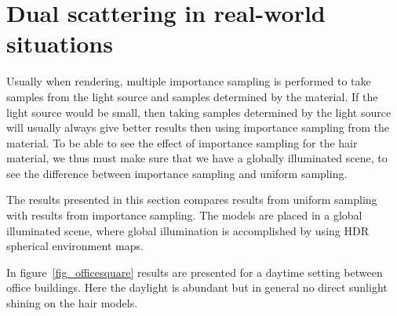 \documentclass[11pt,a4paper]{report}
\begin{document}


%
%

\section{Dual scattering in real-world situations}

Usually when rendering, multiple importance sampling is performed to take samples from the light source and samples determined by the material. If the light source would be small, then taking samples determined by the light source will usually always give better results then using importance sampling from the material. To be able to see the effect of importance sampling for the hair material, we thus must make sure that we have a globally illuminated scene, to see the difference between importance sampling and uniform sampling.

The results presented in this section compares results from uniform sampling with results from importance sampling. The models are placed in a global illuminated scene, where global illumination is accomplished by using HDR spherical environment maps.

In figure~\ref{fig_officesquare} results are presented for a daytime setting between office buildings. Here the daylight is abundant but in general no direct sunlight shining on the hair models. 
\end{document}
